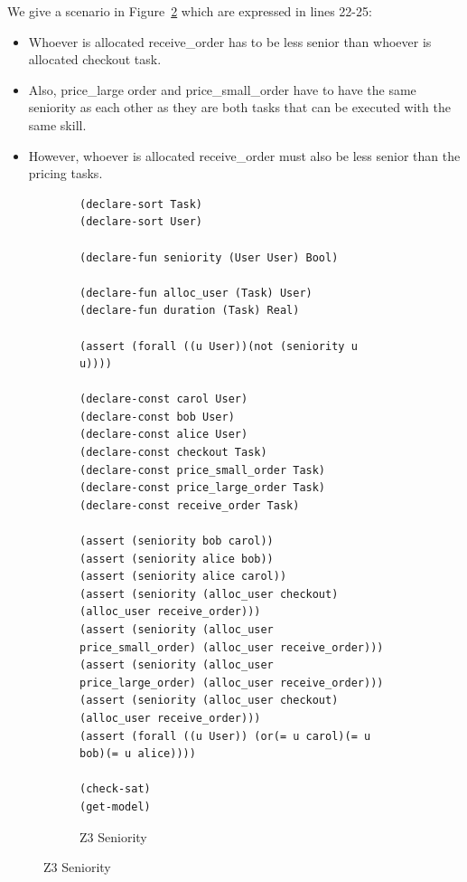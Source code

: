 \documentclass[a4paper]{report}
\begin{document}
We give a scenario in Figure~\ref{fig:Z3 Seniority} which are expressed in lines 22-25:
\begin{itemize}
\item Whoever is allocated receive\_order has to be less senior than whoever is allocated checkout task. 
\item Also, price\_large order and price\_small\_order have to have the same seniority as each other as they are both tasks that can be executed with the same skill.
\item However, whoever is allocated receive\_order must also be less senior than the pricing tasks. 
\end{itemize}

\makeatletter
\newcommand{\srcsize}{\@setfontsize{\srcsize}{10pt}{10pt}}
\makeatother

\begin{figure}[!h]
\begin{subfigure}{\textwidth}
\lstset{numbers=left, showspaces=false,
    showstringspaces=false, tabsize=2, breaklines=true,
    xleftmargin=5.0ex,
}
\begin{lstlisting}[frame=single]
(declare-sort Task) 
(declare-sort User) 

(declare-fun seniority (User User) Bool) 

(declare-fun alloc_user (Task) User) 
(declare-fun duration (Task) Real)

(assert (forall ((u User))(not (seniority u u))))

(declare-const carol User) 
(declare-const bob User) 
(declare-const alice User) 
(declare-const checkout Task)
(declare-const price_small_order Task)
(declare-const price_large_order Task)
(declare-const receive_order Task)

(assert (seniority bob carol)) 
(assert (seniority alice bob)) 
(assert (seniority alice carol))
(assert (seniority (alloc_user checkout) (alloc_user receive_order)))
(assert (seniority (alloc_user price_small_order) (alloc_user receive_order)))
(assert (seniority (alloc_user price_large_order) (alloc_user receive_order)))
(assert (seniority (alloc_user checkout) (alloc_user receive_order)))
(assert (forall ((u User)) (or(= u carol)(= u bob)(= u alice))))

(check-sat)
(get-model)
\end{lstlisting}
\caption{Z3 Seniority}
\label{fig:Z3 Seniority}
\end{subfigure}
\end{figure}
\clearpage
\end{document}
